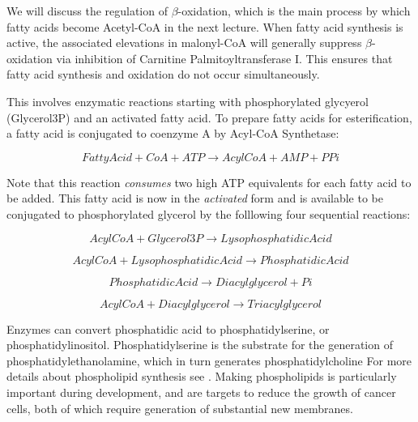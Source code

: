 \documentclass{tufte-handout}
\begin{document}
We will discuss the regulation of $\beta$-oxidation, which is the main process by which fatty acids become Acetyl-CoA in the next lecture.  When fatty acid synthesis is active, the associated elevations in malonyl-CoA will generally suppress $\beta$-oxidation via inhibition of Carnitine Palmitoyltransferase I.  This ensures that fatty acid synthesis and oxidation do not occur simultaneously.

  This involves enzymatic reactions starting with phosphorylated glycyerol (Glycerol3P) and an activated fatty acid.  To prepare fatty acids for esterification, a fatty acid is conjugated to coenzyme A by Acyl-CoA Synthetase:

\begin{equation}
Fatty Acid + CoA +  ATP \rightarrow AcylCoA + AMP + PPi
\end{equation}

Note that this reaction \emph{consumes} two high ATP equivalents for each fatty acid to be added.  This fatty acid is now in the \emph{activated} form and is available to be conjugated to phosphorylated glycerol by the folllowing four sequential reactions:

\begin{equation}\label{eq:gpat}
AcylCoA + Glycerol3P \rightarrow Lysophosphatidic Acid
\end{equation}

\begin{equation}\label{eq:lpat}
AcylCoA + Lysophosphatidic Acid \rightarrow Phosphatidic Acid
\end{equation}

\begin{equation}\label{eq:lipin}
Phosphatidic Acid \rightarrow Diacylglycerol + Pi
\end{equation}

\begin{equation}\label{eq:dgat}
AcylCoA + Diacylglycerol \rightarrow Triacylglycerol
\end{equation}

  Enzymes can convert phosphatidic acid to phosphatidylserine, or phosphatidylinositol.  Phosphatidylserine is the substrate for the generation of phosphatidylethanolamine, which in turn generates phosphatidylcholine  For more details about phospholipid synthesis see \citet{Kent1995}.  Making phospholipids is particularly important during development, and are targets to reduce the growth of cancer cells, both of which require generation of substantial new membranes.  
\end{document}

